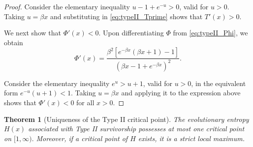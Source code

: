 \documentclass[10pt,a4paper]{amsart}
\newtheorem{thm}{Theorem}[section]
\theoremstyle{definition}
\theoremstyle{remark}
\numberwithin{equation}{section}
\begin{document}
\begin{proof}
Consider the elementary inequality
$u-1+e^{-u}>0$, valid for $u > 0$.
Taking 
\(
u=\beta x
\)
and substituting in \eqref{eq:typeII_Tprime}  shows that $T'(x)>0$. 


We next show that $\Phi'(x)<0$. Upon differentiating $\Phi$ from 
\eqref{eq:typeII_Phi}, we obtain
\begin{equation}
\Phi'(x)
=
\frac{
\beta^2
\left[
e^{-\beta x}(\beta x+1)-1
\right]
}{
(
\beta x-1+e^{-\beta x}
)^2}.
\label{eq:typeII_Phiprime}
\end{equation}

\noindent Consider the elementary inequality $e^u>u+1$, valid for $u>0$, in the equivalent form $ e^{-u}(u+1)<1.$ Taking 
$
u =\beta x
$
and applying it to the expression above
shows that $\Phi'(x)<0$  for all $x>0$.
\end{proof}

\begin{thm}[Uniqueness of the Type II critical point]\label{Unimodal}
The evolutionary entropy $H(x)$ 
associated with Type II  survivorship possesses at
most one critical point on
\(
[1,\infty).
\)
Moreover, if a critical point of $H$ exists, it  is a strict local maximum.
\end{thm}
\end{document}
